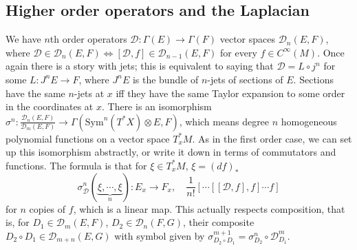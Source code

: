 \subsection{Higher order operators and the Laplacian}
We have $n$th order operators $\mathcal D \colon \Gamma (E) \to \Gamma (F)$ vector spaces $\mathcal D_n (E,F)$, where $\mathcal D  \in \mathcal D_n (E,F) \iff [\mathcal D,f] \in \mathcal D_{n-1}(E,F)$ for every $f \in C ^{\infty}(M)$. Once again there is a story with jets; this is equivalent to saying that $\mathcal D = L \circ j^n $ for some $L \colon J^n E \to F$, where $J^n E$ is the bundle of $n$-jets of sections of $E$. Sections have the same $n$-jets at $x$ iff they have the same Taylor expansion to some order in the coordinates at $x$. There is an isomorphism $\sigma^n  \colon \frac{\mathcal D_n  (E,F)}{\mathcal D_m(E,F)}\to \Gamma \left(\mathrm{Sym}^n (T^*X)\otimes E,F\right)$, which means degree $n$ homogeneous polynomial functions on a vector space $T_x^* M$. As in the first order case, we can set up this isomorphism abstractly, or write it down in terms of commutators and functions. The formula is that for $\xi \in T_x^*M$, $\xi = (df)_*$ \[
        \sigma^n _{\mathcal D}(\underset{n}{\underbrace{\xi,\cdots ,\xi}} ) \colon E_x \to F_x,\quad \frac{1}{n!}\left[ \cdots \left[\left[\mathcal D,f\right],f\right] \cdots f\right]
    \] for $n$ copies of $f$, which is a linear map. This actually respects composition, that is, for $D_1 \in \mathcal D_m (E,F)$, $D_2 \in \mathcal D_n (F,G)$, their composite $D_2 \circ D_1 \in \mathcal D_{m+n}(E,G)$ with symbol given by $\sigma ^{m+1}_{D_2 \circ D_1}= \sigma^n _{D_2}\circ \mathcal D^m_{D_1}$.
